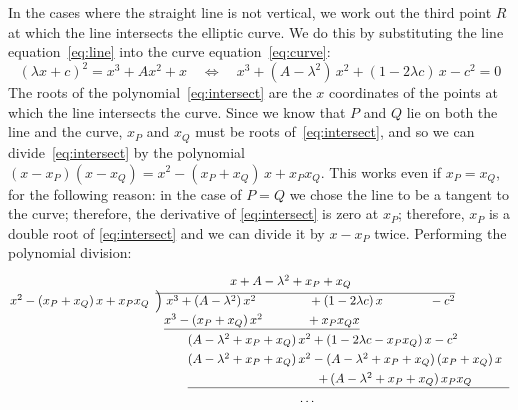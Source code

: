 \documentclass[manuscript]{acmart}
\begin{document}
In the cases where the straight line is not vertical, we work out the third point $R$ at which the line intersects the elliptic curve.
We do this by substituting the line equation~\eqref{eq:line} into the curve equation~\eqref{eq:curve}:
\begin{equation}
(\lambda x + c)^2 = x^3 + Ax^2 + x \quad\iff\quad x^3 + (A - \lambda^2)\, x^2 + (1 - 2\lambda c)\, x - c^2 = 0 \label{eq:intersect}
\end{equation}
The roots of the polynomial~\eqref{eq:intersect} are the $x$ coordinates of the points at which the line intersects the curve.
Since we know that $P$ and $Q$ lie on both the line and the curve, $x_P$ and $x_Q$ must be roots of~\eqref{eq:intersect}, and so we can divide~\eqref{eq:intersect} by the polynomial $(x - x_P)(x - x_Q) = x^2 - (x_P + x_Q)\,x + x_P x_Q$.
This works even if $x_P=x_Q$, for the following reason: in the case of $P=Q$ we chose the line to be a tangent to the curve; therefore, the derivative of \eqref{eq:intersect} is zero at $x_P$; therefore, $x_P$ is a double root of \eqref{eq:intersect} and we can divide it by $x - x_P$ twice.
Performing the polynomial division:
\begin{equation*}\arraycolsep=1pt\def\arraystretch{1.3}
\begin{array}{ll}
& \hspace{60pt} x + A - \lambda^2 + x_P + x_Q \\
x^2 - (x_P + x_Q)\,x + x_P x_Q \;&
\overline{\smash{\Big)}\; x^3 + (A - \lambda^2)\, x^2 \hspace{42pt} + (1 - 2\lambda c)\, x \hspace{37pt} - c^2} \\
& \hspace{7pt}\underline{x^3 - (x_P + x_Q)\, x^2 \hspace{35pt} + x_P x_Q x} \\
& \hspace{26pt}(A - \lambda^2 + x_P + x_Q)\, x^2 + (1 - 2\lambda c - x_P x_Q)\, x - c^2 \\
& \hspace{26pt}(A - \lambda^2 + x_P + x_Q)\, x^2 - (A - \lambda^2 + x_P + x_Q)\,(x_P + x_Q)\, x \\
& \hspace{26pt}\underline{\hspace{105pt} +\, (A - \lambda^2 + x_P + x_Q)\,x_P x_Q \hspace{30pt}} \\
& \hspace{116pt}\dots
\end{array}
\end{equation*}
\end{document}
